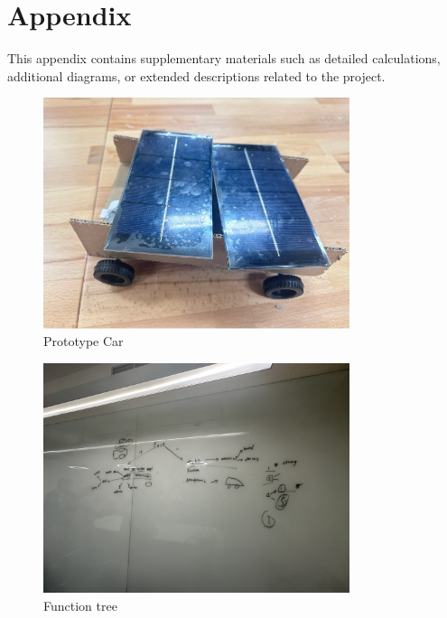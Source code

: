 \documentclass[12pt]{article}
\begin{document}
\section{Appendix}
\setcounter{page}{1}
This appendix contains supplementary materials such as detailed calculations, additional diagrams, or extended descriptions related to the project.
\begin{figure}[h] 
    \centering 
    \includegraphics[width=0.8\textwidth]{figure/car_prototype.jpg} 
    \caption{Prototype Car}
    \label{pic:prototype_car}
\end{figure}
\begin{figure}[h] 
    \centering 
    \includegraphics[width=0.8\textwidth]{figure/function_tree.jpg} 
    \caption{Function tree}
    \label{pic:function tree}
\end{figure}
\end{document}
